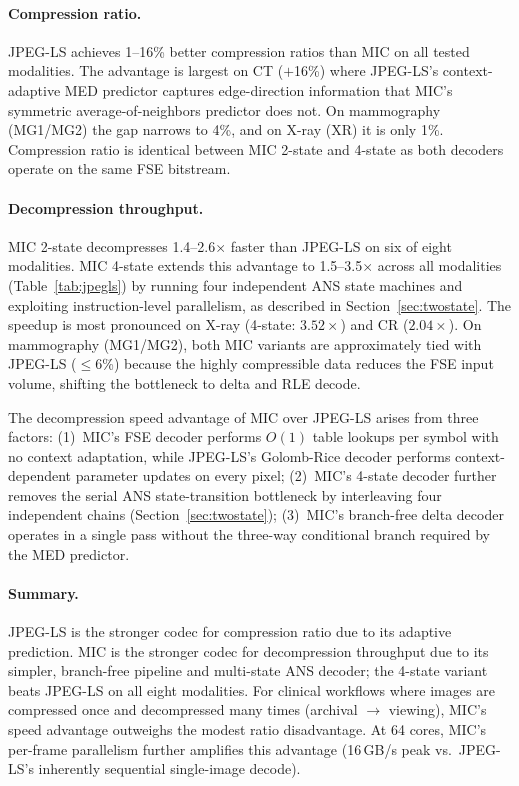 \documentclass[11pt,twocolumn]{article}
\begin{document}
\paragraph{Compression ratio.}
JPEG-LS achieves 1--16\% better compression ratios than MIC on all tested modalities.
The advantage is largest on CT ($+$16\%) where JPEG-LS's context-adaptive MED predictor
captures edge-direction information that MIC's symmetric average-of-neighbors predictor does not.
On mammography (MG1/MG2) the gap narrows to 4\%, and on X-ray (XR) it is only 1\%.
Compression ratio is identical between MIC 2-state and 4-state as both decoders operate
on the same FSE bitstream.

\paragraph{Decompression throughput.}
MIC 2-state decompresses 1.4--2.6$\times$ faster than JPEG-LS on six of eight modalities.
MIC 4-state extends this advantage to 1.5--3.5$\times$ across all modalities (Table~\ref{tab:jpegls})
by running four independent ANS state machines and exploiting instruction-level parallelism,
as described in Section~\ref{sec:twostate}.
The speedup is most pronounced on X-ray (4-state: $3.52\times$) and CR ($2.04\times$).
On mammography (MG1/MG2), both MIC variants are approximately tied with JPEG-LS ($\leq$6\%)
because the highly compressible data reduces the FSE input volume, shifting the bottleneck to
delta and RLE decode.

The decompression speed advantage of MIC over JPEG-LS arises from three factors:
(1)~MIC's FSE decoder performs $O(1)$ table lookups per symbol with no context adaptation,
while JPEG-LS's Golomb-Rice decoder performs context-dependent parameter updates on every pixel;
(2)~MIC's 4-state decoder further removes the serial ANS state-transition bottleneck by
interleaving four independent chains (Section~\ref{sec:twostate});
(3)~MIC's branch-free delta decoder operates in a single pass without the three-way conditional
branch required by the MED predictor.

\paragraph{Summary.}
JPEG-LS is the stronger codec for compression ratio due to its adaptive prediction.
MIC is the stronger codec for decompression throughput due to its simpler, branch-free pipeline
and multi-state ANS decoder; the 4-state variant beats JPEG-LS on all eight modalities.
For clinical workflows where images are compressed once and decompressed many times
(archival $\to$ viewing), MIC's speed advantage outweighs the modest ratio disadvantage.
At 64 cores, MIC's per-frame parallelism further amplifies this advantage (16\,GB/s peak
vs.\ JPEG-LS's inherently sequential single-image decode).
\end{document}
